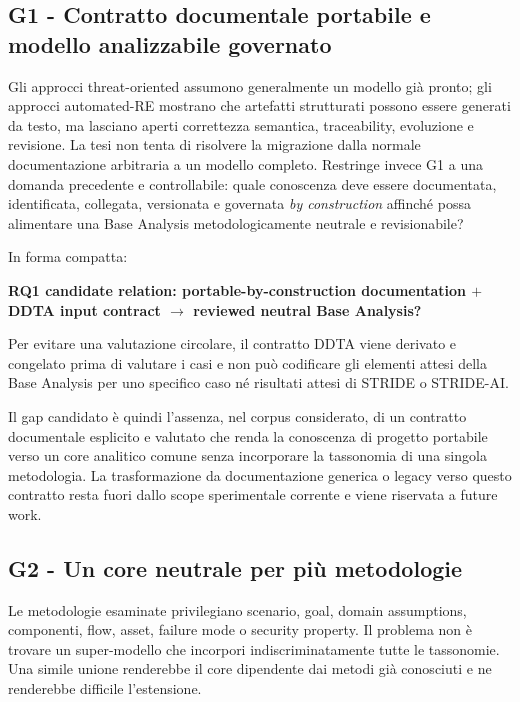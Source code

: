 \documentclass[12pt,a4paper,oneside]{report}
\begin{document}
\subsection{G1 - Contratto documentale portabile e modello analizzabile governato}

Gli approcci threat-oriented assumono generalmente un modello già pronto; gli approcci automated-RE mostrano che artefatti strutturati possono essere generati da testo, ma lasciano aperti correttezza semantica, traceability, evoluzione e revisione. La tesi non tenta di risolvere la migrazione dalla normale documentazione arbitraria a un modello completo. Restringe invece G1 a una domanda precedente e controllabile: quale conoscenza deve essere documentata, identificata, collegata, versionata e governata \emph{by construction} affinché possa alimentare una Base Analysis metodologicamente neutrale e revisionabile?

In forma compatta:

\begin{center}
\textbf{RQ1 candidate relation: portable-by-construction documentation $+$ DDTA input contract $\rightarrow$ reviewed neutral Base Analysis?}
\end{center}

Per evitare una valutazione circolare, il contratto DDTA viene derivato e congelato prima di valutare i casi e non può codificare gli elementi attesi della Base Analysis per uno specifico caso né risultati attesi di STRIDE o STRIDE-AI.

Il gap candidato è quindi l'assenza, nel corpus considerato, di un contratto documentale esplicito e valutato che renda la conoscenza di progetto portabile verso un core analitico comune senza incorporare la tassonomia di una singola metodologia. La trasformazione da documentazione generica o legacy verso questo contratto resta fuori dallo scope sperimentale corrente e viene riservata a future work.

\subsection{G2 - Un core neutrale per più metodologie}

Le metodologie esaminate privilegiano scenario, goal, domain assumptions, componenti, flow, asset, failure mode o security property. Il problema non è trovare un super-modello che incorpori indiscriminatamente tutte le tassonomie. Una simile unione renderebbe il core dipendente dai metodi già conosciuti e ne renderebbe difficile l'estensione.
\end{document}
